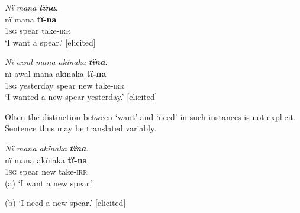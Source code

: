 \ea%
    \label{ex:syntax:393}
          \textit{Nï mana} \textbf{\textit{tïna}}.\\
\gll nï    mana  \textbf{tï-na}\\
    1\textsc{sg}  spear  take-\textsc{irr}\\
\glt `I want a spear.’ [elicited]
\z

\ea%
    \label{ex:syntax:394}
          \textit{Nï awal mana akïnaka} \textbf{\textit{tïna}}.\\
\gll nï    awal    mana  akïnaka  \textbf{tï-na}\\
    1\textsc{sg}  yesterday  spear  new    take-\textsc{irr}\\
\glt `I wanted a new spear yesterday.’ [elicited]
\z

Often the distinction between ‘want’ and ‘need’ in such instances is not explicit. Sentence  thus may be translated variably.

\ea%
    \label{ex:syntax:395}
          \textit{Nï mana akïnaka} \textbf{\textit{tïna}}.\\
\gll nï    mana  akïnaka  \textbf{tï-na}\\
    1\textsc{sg}  spear  new    take-\textsc{irr}\\
\glt    (a) ‘I want a new spear.’

    (b) ‘I need a new spear.’ [elicited]
\z

